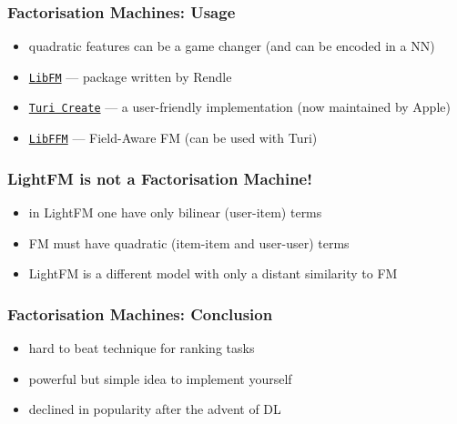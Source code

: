 \documentclass[t]{beamer}
\begin{document}
\begin{frame}
  \frametitle{Factorisation Machines: Usage}
  \begin{itemize}
  \item quadratic features can be a game changer (and can be encoded in a NN)
  \item \href{http://libfm.org/}{\texttt{LibFM}} --- package written by Rendle
  \item \href{https://github.com/apple/turicreate}{\texttt{Turi Create}} --- a user-friendly implementation (now maintained by Apple)
  \item \href{https://github.com/ycjuan/libffm}{\texttt{LibFFM}} --- Field-Aware FM (can be used with Turi)
  \end{itemize}
\end{frame}
\begin{frame}
  \frametitle{LightFM is not a Factorisation Machine!}
  \begin{itemize}
  \item in LightFM one have only bilinear (user-item) terms
  \item FM must have quadratic (item-item and user-user) terms
  \item LightFM is a different model with only a distant similarity to FM
  \end{itemize}
\end{frame}
\begin{frame}
  \frametitle{Factorisation Machines: Conclusion}
  \begin{itemize}
  \item hard to beat technique for ranking tasks
  \item powerful but simple idea to implement yourself
  \item declined in popularity after the advent of DL
  \end{itemize}
\end{frame}
\end{document}
